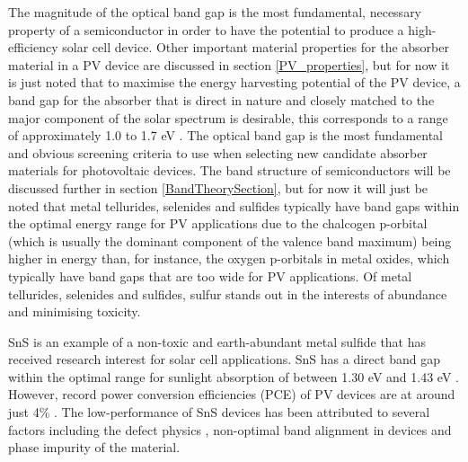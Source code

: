\documentclass[11pt, twoside]{report}
\begin{document}
The magnitude of the optical band gap is the most fundamental, necessary property of a semiconductor in order to have the potential to produce a high-efficiency solar cell device. Other important material properties for the absorber material in a PV device are discussed in section \ref{PV_properties}, but for now it is just noted that to maximise the energy harvesting potential of the PV device, a band gap for the absorber that is direct in nature and closely matched to the major component of the solar spectrum is desirable, this corresponds to a range of approximately 1.0 to 1.7 eV \cite{PV_E_range}. The optical band gap is the most fundamental and obvious screening criteria to use when selecting new candidate absorber materials for photovoltaic devices. The band structure of semiconductors will be discussed further in section \ref{BandTheorySection}, but for now it will just be noted that metal tellurides, selenides and sulfides typically have band gaps within the optimal energy range for PV applications due to the chalcogen p-orbital (which is usually the dominant component of the valence band maximum) being higher in energy than, for instance, the oxygen p-orbitals in metal oxides, which typically have band gaps that are too wide for PV applications. Of metal tellurides, selenides and sulfides, sulfur stands out in the interests of abundance and minimising toxicity.

SnS is an example of a non-toxic and earth-abundant metal sulfide that has received research interest for solar cell applications. SnS has a direct band gap within the optimal range for sunlight absorption of between 1.30 eV \cite{Lee_thesis_59} and 1.43 eV \cite{Lee_thesis_60}. However, record power conversion efficiencies (PCE) of PV devices are at around just 4\% \cite{SnS_record}. The low-performance of SnS devices has been attributed to several factors including the defect physics \cite{Lee_SnS_defects}, non-optimal band alignment in devices \cite{Lee_SnS_band} and phase impurity \cite{Lee_SnS_phases} of the material.
\end{document}
